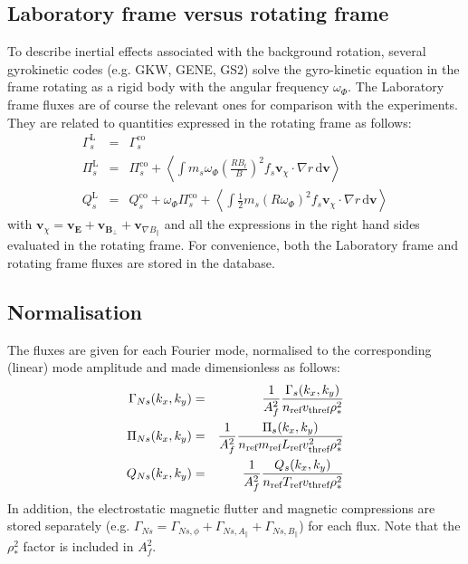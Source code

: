 \documentclass[fleqn]{report}
\begin{document}
\subsection{Laboratory frame versus rotating frame}
To describe inertial effects associated with the background rotation, several gyrokinetic codes (e.g. GKW, GENE, GS2) solve the gyro-kinetic equation in the frame rotating as a rigid body with the angular frequency $\omega_\Phi$. The Laboratory frame fluxes are of course the relevant ones for comparison with the experiments. They are related to quantities expressed in the rotating frame as follows:
\begin{eqnarray}
\Gamma_s^\textrm{L} &=& \Gamma_s^\textrm{co} \\
\Pi_s^\textrm{L} &=& \Pi_s^\textrm{co} + \left< \int m_s\omega_\Phi\left(\frac{RB_t}{B}\right)^2 f_s \mathbf{v}_\chi\cdot \nabla r  \,\textrm{d}\mathbf{v}\right>\\
Q_s^\textrm{L} &=& Q_s^\textrm{co} + \omega_\Phi \Pi_s^\textrm{co}
+ \left< \int \frac{1}{2}m_s(R\omega_\Phi)^2 f_s  \mathbf{v}_\chi\cdot \nabla r \,\textrm{d}\mathbf{v}\right> 
\end{eqnarray}
with $\mathbf{v}_\chi=\mathbf{v}_\mathbf{E} + \mathbf{v}_{\mathbf{B}_\perp}+ \mathbf{v}_{\nabla B_\parallel}$ and all the expressions in the right hand sides evaluated in the rotating frame.
For convenience, both the Laboratory frame and rotating frame fluxes are stored in the database. 


\subsection{Normalisation}
The fluxes are given for each Fourier mode, normalised to the corresponding (linear) mode amplitude and made dimensionless as follows:
\begin{eqnarray}
 \Gamma_{Ns}(k_x,k_y) &=& \frac{1}{A_f^2}\frac{\Gamma_s(k_x,k_y)}{n_{\textrm{ref}} v_\textrm{thref} \rho_*^2}\\
 \Pi_{Ns}(k_x,k_y) &=& \frac{1}{A_f^2}\frac{\Pi_s(k_x,k_y)}{n_{\textrm{ref}} m_{\textrm{ref}} L_{\textrm{ref}} v_\textrm{thref}^2 \rho_*^2}\\
 Q_{Ns}(k_x,k_y) &=& \frac{1}{A_f^2}\frac{Q_s(k_x,k_y)}{n_{\textrm{ref}} T_{\textrm{ref}} v_\textrm{thref} \rho_*^2}
\end{eqnarray}
In addition, the electrostatic magnetic flutter and magnetic compressions are stored separately (e.g. $\Gamma_{Ns}=\Gamma_{Ns,\phi}+\Gamma_{Ns,A_\parallel}+\Gamma_{Ns,B_\parallel}$) for each flux. Note that the $\rho_*^2$ factor is included in $A_f^2$.
\end{document}
